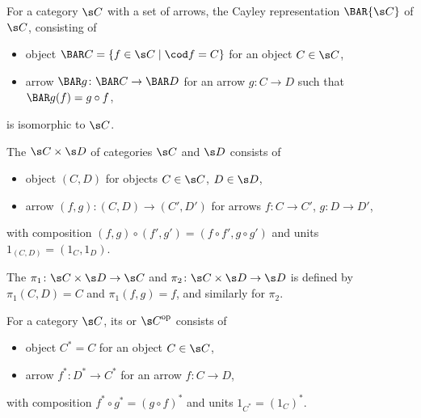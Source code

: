 For a category $\s C$ with a set of arrows, the Cayley representation $\BAR{\s C}$ of $\s C$, consisting of
\begin{itemize}
  \item object $\BAR C = \{ f \in \s C \mid \cod f = C \}$ for an object $C \in \s C$,
  \item arrow $\BAR g \colon \BAR C \to \BAR D$ for an arrow $g \colon C \to D$ such that $\BAR g (f) = g \circ f$,
\end{itemize}
is isomorphic to $\s C$.

The  $\s C \times \s D$ of categories $\s C$ and $\s D$ consists of
\begin{itemize}
  \item object $ (C, D)$ for objects $C \in \s C$, $D \in \s D$,
  \item arrow $(f, g) \colon (C, D) \to (C', D')$ for arrows $f \colon C \to C'$, $g \colon D \to D'$,
\end{itemize}
with composition $(f, g) \circ (f', g') = (f \circ f', g \circ g')$ and units $1_{(C,D)} = (1_C, 1_D)$.

The  $\pi_1 \colon \s C \times \s D \to \s C$ and $\pi_2 \colon \s C \times \s D \to \s D$ is defined by $\pi_1 (C, D) = C$ and $\pi_1 (f,g) = f$, and similarly for $\pi_2$.

For a category $\s C$, its  or  $\op{\s C}$ consists of
\begin{itemize}
  \item object $C^* = C$ for an object $C \in \s C$,
  \item arrow $f^* \colon D^* \to C^*$ for an arrow $f \colon C \to D$,
\end{itemize}
with composition $f^* \circ g^* = ( g \circ f)^*$ and units $1_{C^*} = (1_C)^*$.
\par\quad
{}

